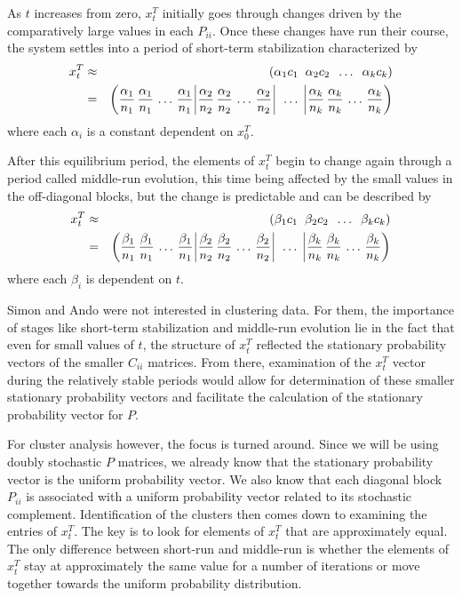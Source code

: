 \documentclass[final]{siamltex}
\begin{document}
As $t$ increases from zero, $x_{t}^{T}$ initially goes through changes driven by the comparatively  large values in each $P_{ii}$. Once these changes have run their course, the system settles into a period of short-term stabilization characterized by
\begin{eqnarray*} \label{sts}
x_{t}^{T}  &\approx& ( \alpha_{1}c_{1} \;\;  \alpha_{2}c_{2} \;\; \dots \;\; \alpha_{k}c_{k}) \\
&=& \left(  
\frac{\alpha_{1}}{n_{1}} \, \frac{\alpha_{1}}{n_{1}} \, \dots \, \frac{\alpha_{1}}{n_{1}} \, \vline \,\frac{\alpha_{2}}{n_{2}} \, \frac{\alpha_{2}}{n_{2}} \, \dots \,  \frac{\alpha_{2}}{n_{2}} \, \vline \;\; \dots \;\; \vline \frac{\alpha_{k}}{n_{k}} \, \frac{\alpha_{k}}{n_{k}} \, \dots \, \frac{\alpha_{k}}{n_{k}}  \right) 
\end{eqnarray*}
where each $\alpha_{i}$ is a constant dependent on $x_{0}^{T}$.

After this equilibrium period, the elements of $x_{t}^{T}$ begin to change again through a period called middle-run evolution, this time being affected by the small values in the off-diagonal blocks, but the change is predictable and can be described by
\begin{eqnarray*} \label{mre}
x_{t}^{T}  &\approx& ( \beta_{1}c_{1} \;\;  \beta_{2}c_{2} \;\; \dots \;\; \beta_{k}c_{k}) \\
&=& \left( \frac{\beta_{1}}{n_{1}} \, \frac{\beta_{1}}{n_{1}} \, \dots \, \frac{\beta_{1}}{n_{1}} \,  \vline \,\frac{\beta_{2}}{n_{2}} \, \frac{\beta_{2}}{n_{2}} \, \dots \, \frac{\beta_{2}}{n_{2}} \, \vline \;\; \dots \;\; \vline \frac{\beta_{k}}{n_{k}} \, \frac{\beta_{k}}{n_{k}} \, \dots \, \frac{\beta_{k}}{n_{k}} \right)
\end{eqnarray*} 
where each $\beta_{i}$ is dependent on $t$.

Simon and Ando were not interested in clustering data. For them, the importance of stages like short-term stabilization and middle-run evolution lie in the fact that even for small values of $t$, the structure of ${x}_{t}^{T}$ reflected the stationary probability vectors of the smaller ${C}_{ii}$ matrices. From there, examination of the ${x}_{t}^{T}$ vector during the relatively stable periods would allow for determination of these smaller stationary probability vectors and facilitate the calculation of the stationary probability vector for $P$.

For cluster analysis however, the focus is turned around. Since we will be using doubly stochastic $P$ matrices, we already know that the stationary probability vector is the uniform probability vector. We also know that each diagonal block ${P}_{ii}$ is associated with a uniform probability vector related to its stochastic complement.  Identification of the clusters then comes down to examining the entries of ${x}_{t}^{T}$. The key is to look for elements of $x_{t}^{T}$ that are approximately equal. The only difference between short-run and middle-run is whether the elements of $x_{t}^{T}$ stay at approximately the same value for a number of iterations or move together towards the uniform probability distribution. 
\end{document}
